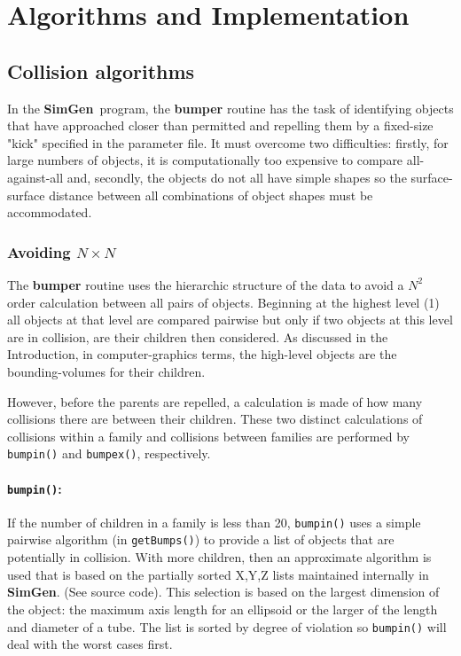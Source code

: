 \documentclass[review]{elsarticle}
\newcommand{\TT}[1]{{\ttfamily\bfseries #1}}
\newcommand{\NAME}{{\TT{SimGen}}}
\begin{document}
\clearpage
\section{Algorithms and Implementation}

\subsection{Collision algorithms}

In the \NAME\ program, the
\TT{bumper} routine has the task of identifying objects that have approached closer
than permitted and repelling them by a fixed-size "kick" specified in the parameter file.
It must overcome two difficulties:  firstly, for large numbers of objects, it is
computationally too expensive to compare all-against-all and, secondly, the objects do not
all have simple shapes so the surface-surface distance between all combinations of
object shapes must be accommodated.

\subsubsection{Avoiding $N \times N$}

The \TT{bumper} routine uses the hierarchic structure of the data to avoid a $N^2$
order calculation between all pairs of objects.  Beginning at the highest level (1)
all objects at that level are compared pairwise but only if two objects at this level
are in collision, are their children then considered. 
As discussed in the Introduction, in computer-graphics terms,
the high-level objects are the bounding-volumes for their children. 

However, before the parents are repelled, a calculation is made of how many collisions
there are between their children.  These two distinct calculations of collisions
within a family and collisions between families are performed by {\tt bumpin()}
and {\tt bumpex()}, respectively.

\paragraph{{\tt \bfseries bumpin()}:\\}

If the number of children in a family is less than 20, {\tt bumpin()}
uses a simple pairwise algorithm (in {\tt getBumps()}) to provide a list of objects that
are potentially in collision.  With more children, then an approximate algorithm
is used that is based on the partially sorted X,Y,Z lists maintained internally in \NAME . (See
source code).  This selection is based on the largest dimension of the object:  the maximum
axis length for an ellipsoid or the larger of the length and diameter of a tube.  The list
is sorted by degree of violation so {\tt bumpin()} will deal with the worst cases first.
\end{document}
